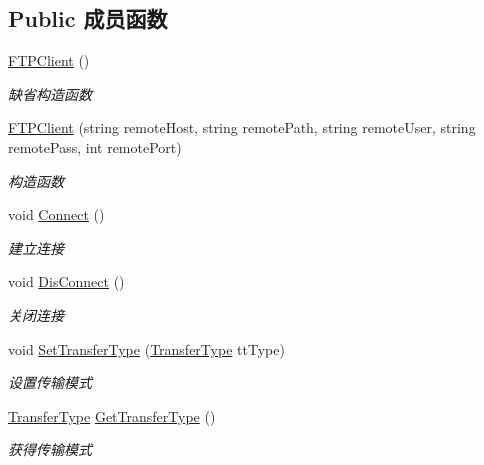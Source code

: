 \subsection*{Public 成员函数}
\begin{DoxyCompactItemize}
\item 
\hyperlink{class_x_c_l_net_tools_1_1_f_t_p_1_1_f_t_p_client_a676653f395ab68c5da43f284bf06a18e}{F\+T\+P\+Client} ()
\begin{DoxyCompactList}\small\item\em 缺省构造函数 \end{DoxyCompactList}\item 
\hyperlink{class_x_c_l_net_tools_1_1_f_t_p_1_1_f_t_p_client_a8ce62cd58f4f1825fcb38503fffd664c}{F\+T\+P\+Client} (string remote\+Host, string remote\+Path, string remote\+User, string remote\+Pass, int remote\+Port)
\begin{DoxyCompactList}\small\item\em 构造函数 \end{DoxyCompactList}\item 
void \hyperlink{class_x_c_l_net_tools_1_1_f_t_p_1_1_f_t_p_client_a80b5588cccdbc0fc599da3b065c17824}{Connect} ()
\begin{DoxyCompactList}\small\item\em 建立连接 \end{DoxyCompactList}\item 
void \hyperlink{class_x_c_l_net_tools_1_1_f_t_p_1_1_f_t_p_client_a68ed147abe1a9c0425e7168b37519979}{Dis\+Connect} ()
\begin{DoxyCompactList}\small\item\em 关闭连接 \end{DoxyCompactList}\item 
void \hyperlink{class_x_c_l_net_tools_1_1_f_t_p_1_1_f_t_p_client_a34ec9858385eb10edb576ee871a0e02f}{Set\+Transfer\+Type} (\hyperlink{class_x_c_l_net_tools_1_1_f_t_p_1_1_f_t_p_client_adef28404af1c916d9bd2bfbfa924b707}{Transfer\+Type} tt\+Type)
\begin{DoxyCompactList}\small\item\em 设置传输模式 \end{DoxyCompactList}\item 
\hyperlink{class_x_c_l_net_tools_1_1_f_t_p_1_1_f_t_p_client_adef28404af1c916d9bd2bfbfa924b707}{Transfer\+Type} \hyperlink{class_x_c_l_net_tools_1_1_f_t_p_1_1_f_t_p_client_abc5c0e7353bbbf20f1dcc1ee2f5d5c3f}{Get\+Transfer\+Type} ()
\begin{DoxyCompactList}\small\item\em 获得传输模式 \end{DoxyCompactList}\item 

\end{DoxyCompactItemize}
